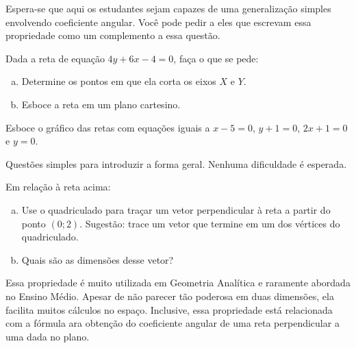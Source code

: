 \documentclass[main_estudante.tex]{subfiles}
\begin{document}
Espera-se que aqui os estudantes sejam capazes de uma generalização simples envolvendo coeficiente angular. Você pode pedir a eles que escrevam essa propriedade como um complemento a essa questão.

\begin{questao}
Dada a reta de equação $4y+6x-4=0$, faça o que se pede:
\begin{enumerate}[a)]
\item Determine os pontos em que ela corta os eixos $X$ e $Y$.
\item Esboce a reta em um plano cartesino.
\end{enumerate} 
\end{questao}

\begin{questao}
Esboce o gráfico das retas com equações iguais a $x-5=0$, $y+1=0$, $2x+1=0$ e $y=0$.
\end{questao}

Questões simples para introduzir a forma geral. Nenhuma dificuldade é esperada.

\begin{questao}
Em relação à reta acima:
\begin{enumerate}[a)]
\item Use o quadriculado para traçar um vetor perpendicular à reta a partir do ponto $(0;2)$. Sugestão: trace um vetor que termine em um dos vértices do quadriculado.
\item Quais são as dimensões desse vetor?
\end{enumerate} 
\end{questao}

Essa propriedade é muito utilizada em Geometria Analítica e raramente abordada no Ensino Médio. Apesar de não parecer tão poderosa em duas dimensões, ela facilita muitos cálculos no espaço. Inclusive, essa propriedade está relacionada com a fórmula ara obtenção do coeficiente angular de uma reta perpendicular a uma dada no plano.
\end{document}
